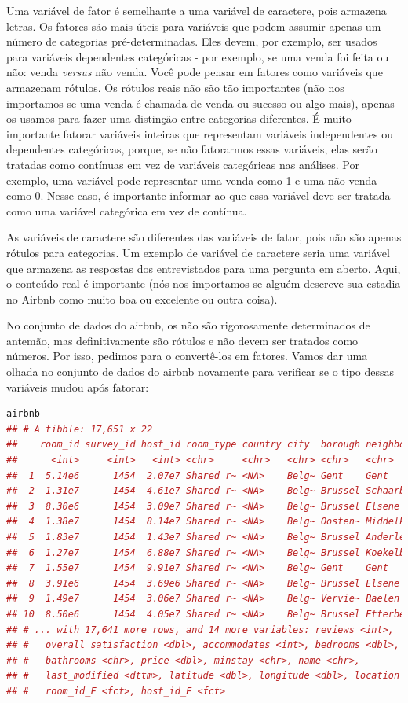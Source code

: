 \documentclass{article}
\begin{document}
Uma variável de fator é semelhante a uma variável de caractere, pois armazena letras. Os fatores são mais úteis para variáveis que podem assumir apenas um número de categorias pré-determinadas. Eles devem, por exemplo, ser usados para variáveis dependentes categóricas - por exemplo, se uma venda foi feita ou não: venda \textit{versus} não venda. Você pode pensar em fatores como variáveis que armazenam rótulos. Os rótulos reais não são tão importantes (não nos importamos se uma venda é chamada de venda ou sucesso ou algo mais), apenas os usamos para fazer uma distinção entre categorias diferentes. É muito importante fatorar variáveis inteiras que representam variáveis independentes ou dependentes categóricas, porque, se não fatorarmos essas variáveis, elas serão tratadas como contínuas em vez de variáveis categóricas nas análises. Por exemplo, uma variável pode representar uma venda como 1 e uma não-venda como 0. Nesse caso, é importante informar ao \faRProject que essa variável deve ser tratada como uma variável categórica em vez de contínua.

As variáveis de caractere são diferentes das variáveis de fator, pois não são apenas rótulos para categorias. Um exemplo de variável de caractere seria uma variável que armazena as respostas dos entrevistados para uma pergunta em aberto. Aqui, o conteúdo real é importante (nós nos importamos se alguém descreve sua estadia no Airbnb como muito boa ou excelente ou outra coisa).

No conjunto de dados do airbnb, os  não são rigorosamente determinados de antemão, mas definitivamente são rótulos e não devem ser tratados como números. Por isso, pedimos para o \faRProject convertê-los em fatores. Vamos dar uma olhada no conjunto de dados do airbnb novamente para verificar se o tipo dessas variáveis mudou após fatorar:

\begin{lstlisting}[language=R]
airbnb
## # A tibble: 17,651 x 22
##    room_id survey_id host_id room_type country city  borough neighborhood
##      <int>     <int>   <int> <chr>     <chr>   <chr> <chr>   <chr>       
##  1  5.14e6      1454  2.07e7 Shared r~ <NA>    Belg~ Gent    Gent        
##  2  1.31e7      1454  4.61e7 Shared r~ <NA>    Belg~ Brussel Schaarbeek  
##  3  8.30e6      1454  3.09e7 Shared r~ <NA>    Belg~ Brussel Elsene      
##  4  1.38e7      1454  8.14e7 Shared r~ <NA>    Belg~ Oosten~ Middelkerke 
##  5  1.83e7      1454  1.43e7 Shared r~ <NA>    Belg~ Brussel Anderlecht  
##  6  1.27e7      1454  6.88e7 Shared r~ <NA>    Belg~ Brussel Koekelberg  
##  7  1.55e7      1454  9.91e7 Shared r~ <NA>    Belg~ Gent    Gent        
##  8  3.91e6      1454  3.69e6 Shared r~ <NA>    Belg~ Brussel Elsene      
##  9  1.49e7      1454  3.06e7 Shared r~ <NA>    Belg~ Vervie~ Baelen      
## 10  8.50e6      1454  4.05e7 Shared r~ <NA>    Belg~ Brussel Etterbeek   
## # ... with 17,641 more rows, and 14 more variables: reviews <int>,
## #   overall_satisfaction <dbl>, accommodates <int>, bedrooms <dbl>,
## #   bathrooms <chr>, price <dbl>, minstay <chr>, name <chr>,
## #   last_modified <dttm>, latitude <dbl>, longitude <dbl>, location <chr>,
## #   room_id_F <fct>, host_id_F <fct>
\end{lstlisting}
\end{document}
